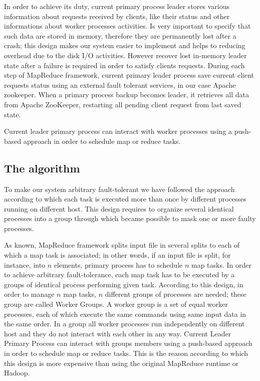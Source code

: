 \documentclass[sigchi]{acmart}
\begin{document}
In order to achieve its duty, current primary process leader stores various information about requests received by clients, like their status and other informations about worker processes activities. Is very important to specify that such data are stored in memory, therefore they are permanently lost after a crash; this design makes our system  easier to implement and helps to reducing overhead due to the disk I/O activities. However recover lost in-memory leader state after a failure is required in order to satisfy clients requests. During each step of MapReduce framework, current primary leader process save current client requests status using an external fault tolerant services, in our case Apache zookeeper. When a primary process backup becomes leader, it retrieves all data from Apache ZooKeeper, restarting all pending client request from last saved state.

Current leader primary process can interact with worker processes using a push-based approach in order to schedule map or reduce tasks.






\subsection{The algorithm}

To make our system arbitrary fault-tolerant we have followed the approach according to which each task is executed more than once by different processes running on different host. This design requires to organize several identical processes into a group through which became possible to mask one or more faulty processes. 

As known, MapReduce framework splits input file in several splits to each of which a map task is associated; in other words, if an input file is split, for instance, into $n$ elements, primary process has to schedule $n$ map tasks. In order to achieve arbitrary fault-tolerance, each map task has to be executed by a groups of identical process performing given task. According to this design, in order to manage $n$ map tasks, $n$ different groups of processes are needed; these group are called Worker Groups. A worker group is a set of equal worker processes, each of which execute the same commands using same input data in the same order. In a group all worker processes run independently on different host and they do not interact with each other in any way. Current Leader Primary Process can interact with groups members using a push-based approach in order to schedule map or reduce tasks. This is the reason according to which this design is more expensive than using the original MapReduce runtime or Hadoop.
\end{document}
